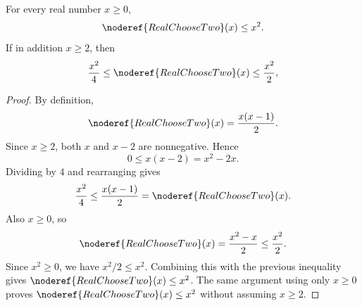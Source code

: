 \begin{lemma}
For every real number \(x\ge0\),
\[
\noderef{RealChooseTwo}(x)\le x^2.
\]
If in addition \(x\ge2\), then
\[
\frac{x^2}{4}\le \noderef{RealChooseTwo}(x)\le\frac{x^2}{2},
\]
\end{lemma}
\begin{proof}
By definition,
\[
\noderef{RealChooseTwo}(x)=\frac{x(x-1)}2.
\]
Since \(x\ge2\), both \(x\) and \(x-2\) are nonnegative.  Hence
\[
0\le x(x-2)=x^2-2x.
\]
Dividing by \(4\) and rearranging gives
\[
\frac{x^2}{4}\le\frac{x(x-1)}2=\noderef{RealChooseTwo}(x).
\]
Also \(x\ge0\), so
\[
\noderef{RealChooseTwo}(x)=\frac{x^2-x}{2}\le\frac{x^2}{2}.
\]
Since \(x^2\ge0\), we have \(x^2/2\le x^2\).  Combining this with the previous
inequality gives \(\noderef{RealChooseTwo}(x)\le x^2\).  The same argument
using only \(x\ge0\) proves \(\noderef{RealChooseTwo}(x)\le x^2\) without
assuming \(x\ge2\).
\end{proof}
